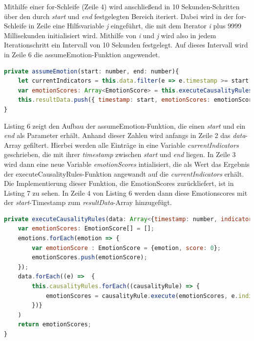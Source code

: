 Mithilfe einer for-Schleife (Zeile 4) wird anschließend in 10 Sekunden-Schritten über den durch \textit{start} und \textit{end} festgelegten Bereich iteriert. Dabei wird in der for-Schleife in Zeile eine Hilfsvariable \textit{j} eingeführt, die mit dem Iterator \textit{i} plus 9999 Millisekunden initialisiert wird. Mithilfe von \textit{i} und \textit{j} wird also in jedem Iterationschritt ein Intervall von 10 Sekunden festgelegt. Auf dieses Intervall wird in Zeile 6 die assumeEmotion-Funktion angewendet. \newline
\begin{lstlisting}[caption={assumeEmotion-Funktion der Decider-Klasse}, language=JavaScript]
private assumeEmotion(start: number, end: number){
	let currentIndicators = this.data.filter(e => e.timestamp >= start &&   e.timestamp <= end)
	var emotionScores: Array<EmotionScore> = this.executeCausalityRules(currentIndicators);
	this.resultData.push({ timestamp: start, emotionScores: emotionScores});
}
\end{lstlisting}
Listing 6 zeigt den Aufbau der assumeEmotion-Funktion, die einen \textit{start} und ein \textit{end} als Parameter erhält. Anhand dieser Zahlen wird anfangs in Zeile 2 das \textit{data}-Array gefiltert. Hierbei werden alle Einträge in eine Variable \textit{currentIndicators} geschrieben, die mit ihrer \textit{timestamp} zwischen \textit{start} und \textit{end} liegen. \newline
In Zeile 3 wird dann eine neue Variable \textit{emotionScores} intialisiert, die als Wert das Ergebnis der executeCausalityRules-Funktion angewandt auf die \textit{currentIndicators} erhält. Die Implementierung dieser Funktion, die EmotionScores zurückliefert, ist in Listing 7 zu sehen. In Zeile 4 von Listing 6 werden dann diese Emotionscores mit der \textit{start}-Timestamp zum \textit{resultData}-Array hinzugefügt. \newline 
\begin{lstlisting}[caption={executeCausalityRules-Funktion der Decider-Klasse}, language=JavaScript]
private executeCausalityRules(data: Array<{timestamp: number, indicatorScores: IndicatorScore[]}>){   
	var emotionScores: EmotionScore[] = [];
	emotions.forEach(emotion => {
		var emotionScore : EmotionScore = {emotion, score: 0};
		emotionScores.push(emotionScore);
	});
	data.forEach((e) =>  { 
		this.causalityRules.forEach((causalityRule) => {
			emotionScores = causalityRule.execute(emotionScores, e.indicatorScores)  ;
		})}
	)
	return emotionScores;
}
\end{lstlisting}
